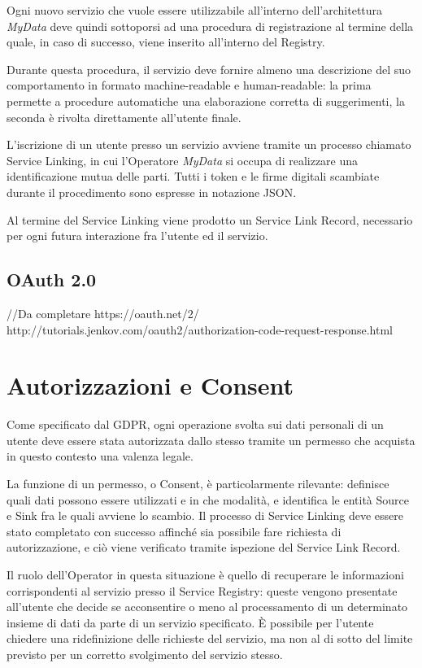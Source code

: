 Ogni nuovo servizio che vuole essere utilizzabile all’interno dell’architettura \textit{MyData} deve quindi sottoporsi ad una procedura di registrazione al termine della quale, in caso di successo, viene inserito all’interno del Registry.

Durante questa procedura, il servizio deve fornire almeno una descrizione del suo comportamento in formato machine-readable e human-readable: la prima permette a procedure automatiche una elaborazione corretta di suggerimenti, la seconda \`e rivolta direttamente all’utente finale.

L’iscrizione di un utente presso un servizio avviene tramite un processo chiamato Service Linking, in cui l’Operatore \textit{MyData} si occupa di realizzare una identificazione mutua delle parti. Tutti i token e le firme digitali scambiate durante il procedimento sono espresse in notazione JSON.

Al termine del Service Linking viene prodotto un Service Link Record, necessario per ogni futura interazione fra l’utente ed il servizio.

\subsection{OAuth 2.0}
//Da completare
https://oauth.net/2/
http://tutorials.jenkov.com/oauth2/authorization-code-request-response.html

\section{Autorizzazioni e Consent}
Come specificato dal GDPR, ogni operazione svolta sui dati personali di un utente deve essere stata autorizzata dallo stesso tramite un permesso che acquista in questo contesto una valenza legale.

La funzione di un permesso, o Consent, \`e particolarmente rilevante: definisce quali dati possono essere utilizzati e in che modalit\`a, e identifica le entit\`a Source e Sink fra le quali avviene lo scambio. Il processo di Service Linking deve essere stato completato con successo affinch\'e sia possibile fare richiesta di autorizzazione, e ci\`o viene verificato tramite ispezione del Service Link Record.

Il ruolo dell’Operator in questa situazione \`e quello di recuperare le informazioni corrispondenti al servizio presso il Service Registry: queste vengono presentate all’utente che decide se acconsentire o meno al processamento di un determinato insieme di dati da parte di un servizio specificato. È possibile per l’utente chiedere una ridefinizione delle richieste del servizio, ma non al di sotto del limite previsto per un corretto svolgimento del servizio stesso.

